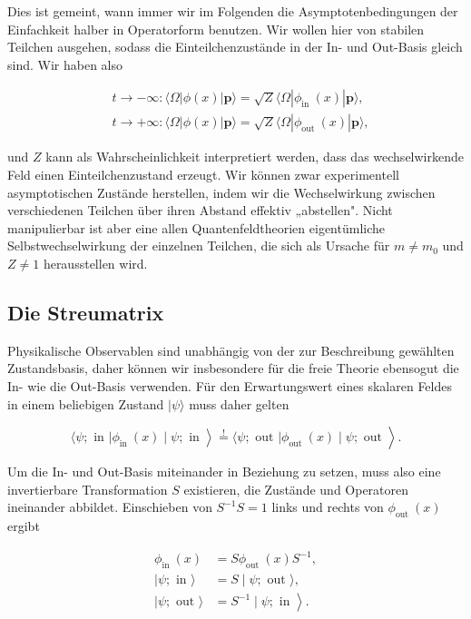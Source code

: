 \documentclass[10pt, letterpaper]{article}
\begin{document}
Dies ist gemeint, wann immer wir im Folgenden die Asymptotenbedingungen der Einfachkeit halber in Operatorform benutzen. Wir wollen hier von stabilen Teilchen ausgehen, sodass die Einteilchenzustände in der In- und Out-Basis gleich sind. Wir haben also

$$
\begin{aligned}
& t \rightarrow-\infty:\langle\Omega| \phi(x)|\mathbf{p}\rangle=\sqrt{Z}\langle\Omega| \phi_{\text {in }}(x)|\mathbf{p}\rangle, \\
& t \rightarrow+\infty:\langle\Omega| \phi(x)|\mathbf{p}\rangle=\sqrt{Z}\langle\Omega| \phi_{\text {out }}(x)|\mathbf{p}\rangle,
\end{aligned}
$$

und $Z$ kann als Wahrscheinlichkeit interpretiert werden, dass das wechselwirkende Feld einen Einteilchenzustand erzeugt. Wir können zwar experimentell asymptotischen Zustände herstellen, indem wir die Wechselwirkung zwischen verschiedenen Teilchen über ihren Abstand effektiv „abstellen". Nicht manipulierbar ist aber eine allen Quantenfeldtheorien eigentümliche Selbstwechselwirkung der einzelnen Teilchen, die sich als Ursache für $m \neq m_{0}$ und $Z \neq 1$ herausstellen wird.

\subsection*{Die Streumatrix}
Physikalische Observablen sind unabhängig von der zur Beschreibung gewählten Zustandsbasis, daher können wir insbesondere für die freie Theorie ebensogut die In- wie die Out-Basis verwenden. Für den Erwartungswert eines skalaren Feldes in einem beliebigen Zustand $|\psi\rangle$ muss daher gelten

$$
\left.\left.\langle\psi ; \text { in }| \phi_{\text {in }}(x) \mid \psi ; \text { in }\right\rangle \stackrel{!}{=}\langle\psi ; \text { out }| \phi_{\text {out }}(x) \mid \psi ; \text { out }\right\rangle .
$$

Um die In- und Out-Basis miteinander in Beziehung zu setzen, muss also eine invertierbare Transformation $S$ existieren, die Zustände und Operatoren ineinander abbildet. Einschieben von $S^{-1} S=1$ links und rechts von $\phi_{\text {out }}(x)$ ergibt

$$
\begin{aligned}
\phi_{\text {in }}(x) & =S \phi_{\text {out }}(x) S^{-1}, \\
\mid \psi ; \text { in }\rangle & =S \mid \psi ; \text { out }\rangle, \\
\mid \psi ; \text { out }\rangle & \left.=S^{-1} \mid \psi ; \text { in }\right\rangle .
\end{aligned}
$$
\end{document}
